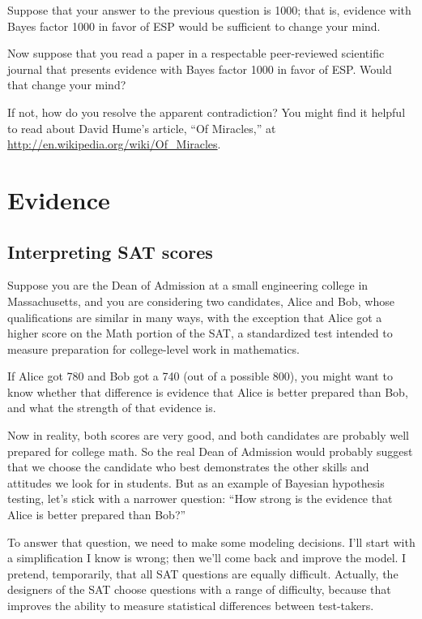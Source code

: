 \documentclass[12pt]{book}
\begin{document}
\begin{exercise}
Suppose that your answer to the previous question is 1000;
that is, evidence with Bayes factor 1000 in favor of ESP would
be sufficient to change your mind.

Now suppose that you read a paper in a respectable peer-reviewed
scientific journal that presents evidence with Bayes factor 1000 in
favor of ESP.  Would that change your mind?

If not, how do you resolve the apparent contradiction?
You might find it helpful to read about David Hume's article, ``Of
Miracles,'' at \url{http://en.wikipedia.org/wiki/Of_Miracles}.

\end{exercise}



\chapter{Evidence}
\label{evidence}

\section{Interpreting SAT scores}

Suppose you are the Dean of Admission at a small engineering
college in Massachusetts, and you are considering two candidates,
Alice and Bob, whose qualifications are similar in many ways,
with the exception that Alice got a higher score on the Math
portion of the SAT, a standardized test intended to measure
preparation for college-level work in mathematics.

If Alice got 780 and Bob got a 740 (out of a possible 800), you might
want to know whether that difference is evidence that Alice is better
prepared than Bob, and what the strength of that evidence is.

Now in reality, both scores are very good, and both 
candidates are probably well prepared for college math.  So
the real Dean of Admission would probably suggest that we choose
the candidate who best demonstrates the other skills and
attitudes we look for in students.  But as an example of
Bayesian hypothesis testing, let's stick with a narrower question:
``How strong is the evidence that Alice is better prepared
than Bob?''

To answer that question, we need to make some modeling decisions.
I'll start with a simplification I know is wrong; then we'll come back
and improve the model.  I pretend, temporarily, that
all SAT questions are equally difficult.  Actually, the designers of
the SAT choose questions with a range of difficulty, because that
improves the ability to measure statistical differences between
test-takers.
\end{document}

